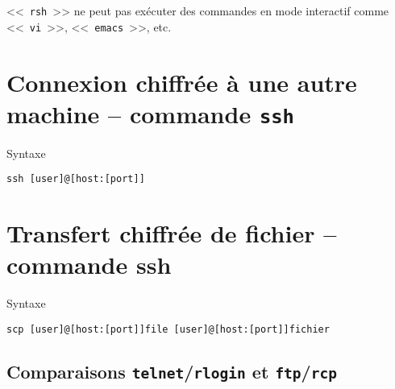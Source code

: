 \begin{remarque}
<<~{\tt rsh}~>> ne peut pas ex{\'e}cuter des commandes en mode interactif comme
<<~{\tt vi}~>>, <<~{\tt emacs}~>>, etc.
\end{remarque}

\section{\texorpdfstring{Connexion chiffr{\'e}e {\`a} une autre machine -- commande {\tt ssh}}{Connexion chiffr{\'e}e {\`a} une autre machine -- commande ssh}}

\begin{definition}{Syntaxe}
\begin{verbatim}
ssh [user]@[host:[port]]
\end{verbatim}
\end{definition}

\section{Transfert chiffr{\'e}e de fichier -- commande ssh}

\begin{definition}{Syntaxe}
\begin{verbatim}
scp [user]@[host:[port]]file [user]@[host:[port]]fichier 
\end{verbatim}
\end{definition}

\subsection{\texorpdfstring{Comparaisons \texttt{telnet}/\texttt{rlogin} et \texttt{ftp}/\texttt{rcp}}{Comparaisons telnet/rlogin et ftp/rcp}}

